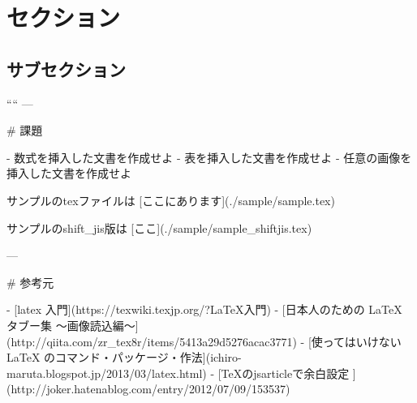 \section{セクション}

\subsection{サブセクション}


````
---

# 課題

- 数式を挿入した文書を作成せよ
- 表を挿入した文書を作成せよ
- 任意の画像を挿入した文書を作成せよ

サンプルのtexファイルは
[ここにあります](./sample/sample.tex)

サンプルのshift_jis版は
[ここ](./sample/sample_shiftjis.tex)

---

# 参考元

- [latex 入門](https://texwiki.texjp.org/?LaTeX入門)
- [日本人のための LaTeX タブー集 ～画像読込編～](http://qiita.com/zr_tex8r/items/5413a29d5276acac3771)
- [使ってはいけない LaTeX のコマンド・パッケージ・作法](ichiro-maruta.blogspot.jp/2013/03/latex.html)
- [TeXのjsarticleで余白設定 ](http://joker.hatenablog.com/entry/2012/07/09/153537)


